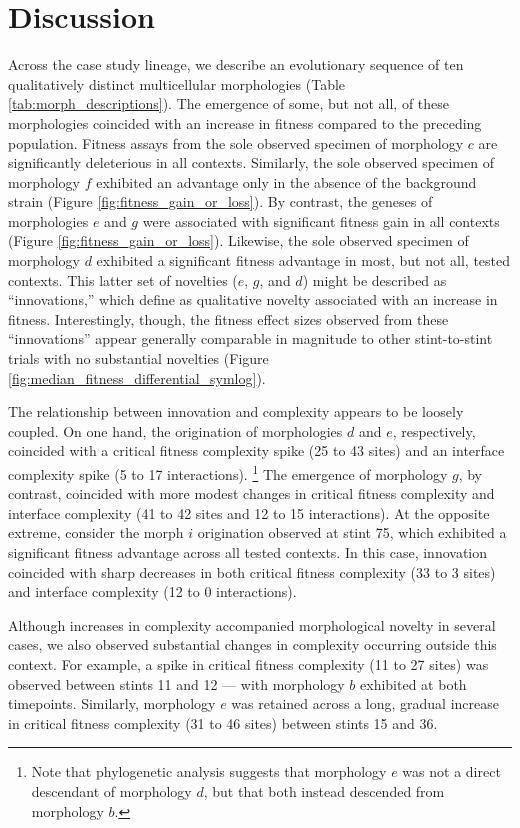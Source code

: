 \section{Discussion}

Across the case study lineage, we describe an evolutionary sequence of ten qualitatively distinct multicellular morphologies (Table \ref{tab:morph_descriptions}).
The emergence of some, but not all, of these morphologies coincided with an increase in fitness compared to the preceding population.
Fitness assays from the sole observed specimen of morphology $c$ are significantly deleterious in all contexts.
Similarly, the sole observed specimen of morphology $f$ exhibited an advantage only in the absence of the background strain (Figure \ref{fig:fitness_gain_or_loss}).
By contrast, the geneses of morphologies $e$ and $g$ were associated with significant fitness gain in all contexts (Figure \ref{fig:fitness_gain_or_loss}).
Likewise, the sole observed specimen of morphology $d$ exhibited a significant fitness advantage in most, but not all, tested contexts.
This latter set of novelties ($e$, $g$, and $d$) might be described as ``innovations,'' which \citet{hochberg2017innovation} define as qualitative novelty associated with an increase in fitness.
Interestingly, though, the fitness effect sizes observed from these ``innovations'' appear generally comparable in magnitude to other stint-to-stint trials with no substantial novelties (Figure \ref{fig:median_fitness_differential_symlog}).

The relationship between innovation and complexity appears to be loosely coupled.
On one hand, the origination of morphologies $d$ and $e$, respectively, coincided with a critical fitness complexity spike (25 to 43 sites) and an interface complexity spike (5 to 17 interactions).%
\footnote{Note that phylogenetic analysis suggests that morphology $e$ was not a direct descendant of morphology $d$, but that both instead descended from morphology $b$.}
The emergence of morphology $g$, by contrast, coincided with more modest changes in critical fitness complexity and interface complexity (41 to 42 sites and 12 to 15 interactions). 
At the opposite extreme, consider the morph $i$ origination observed at stint 75, which exhibited a significant fitness advantage across all tested contexts.
In this case, innovation coincided with sharp decreases in both critical fitness complexity (33 to 3 sites) and interface complexity (12 to 0 interactions).

Although increases in complexity accompanied morphological novelty in several cases, we also observed substantial changes in complexity occurring outside this context.
For example, a spike in critical fitness complexity (11 to 27 sites) was observed between stints 11 and 12 --- with morphology $b$ exhibited at both timepoints.
Similarly, morphology $e$ was retained across a long, gradual increase in critical fitness complexity (31 to 46 sites) between stints 15 and 36.

